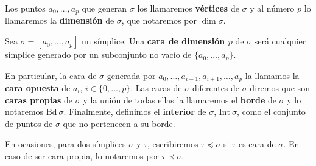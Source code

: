 Los puntos \(a_{0}, \ldots, a_{p}\) que generan \(\sigma\) los llamaremos \textbf{vértices}
de \(\sigma\) y al número \(p\) lo llamaremos la \textbf{dimensión} de \(\sigma\), que
notaremos por \(\dim \sigma\).

\begin{definicion}
	Sea \(\sigma=[a_{0}, \ldots, a_{p}]\) un símplice. Una \textbf{cara de dimensión
	\(p\)} de \(\sigma\) será cualquier símplice generado por un subconjunto no vacío de
	\(\{a_{0}, \ldots, a_{p}\}\).
\end{definicion}
En particular, la cara de \(\sigma\) generada por
\(a_{0}, \ldots, a_{i-1}, a_{i+1}, \ldots, a_{p}\) la llamamos la \textbf{cara
opuesta} de \(a_{i}\), \(i \in \{0, \ldots, p\}\). Las caras de \(\sigma\) diferentes de
\(\sigma\) diremos que son \textbf{caras propias} de \(\sigma\) y la unión de todas
ellas la llamaremos el \textbf{borde} de \(\sigma\) y lo notaremos \(\text{Bd}\ \sigma\).
Finalmente, definimos el \textbf{interior} de \(\sigma\), \(\text{Int}\ \sigma\),
como el conjunto de puntos de \(\sigma\) que no pertenecen a su borde.

En ocasiones, para dos símplices \(\sigma\) y \(\tau\), escribiremos
\(\tau \preceq \sigma\) si \(\tau\) es cara de \(\sigma\). En caso de ser cara propia,
lo notaremos por \(\tau \prec \sigma\).

